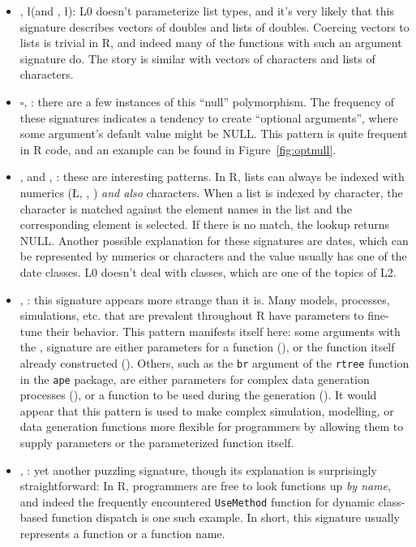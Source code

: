 \documentclass[acmsmall,10pt,review,anonymous]{acmart}\settopmatter{printfolios=true,printccs=false,printacmref=false}
\begin{document}
\begin{itemize}

	\item \D, \l (and \C, \l): L0 doesn't parameterize list types, and it's very likely that this signature describes vectors of doubles and lists of doubles.
	Coercing vectors to lists is trivial in R, and indeed many of the functions with such an argument signature do.
	The story is similar with vectors of characters and lists of characters.
	
	\item $\square$, \sN: there are a few instances of this ``null'' polymorphism.
	The frequency of these signatures indicates a tendency to create ``optional arguments'', where some argument's default value might be NULL.
	This pattern is quite frequent in R code, and an example can be found in Figure~\ref{fig:optnull}.

	\item \C, \D and \C, \I: these are interesting patterns.
	In R, lists can always be indexed with numerics (\L, \D, \I) {\it and also} characters.
	When a list is indexed by character, the character is matched against the element names in the list and the corresponding element is selected.
	If there is no match, the lookup returns NULL.
	Another possible explanation for these signatures are dates, which can be represented by numerics or characters and the value usually has one of the date classes.
	L0 doesn't deal with classes, which are one of the topics of L2.

	\item \D, \sF: this signature appears more strange than it is.
	Many models, processes, simulations, etc. that are prevalent throughout R have parameters to fine-tune their behavior.
	This pattern manifests itself here: some arguments with the \D, \sF signature are either parameters for a function (\D), or the function itself already constructed (\sF).
	Others, such as the {\tt br} argument of the {\tt rtree} function in the {\tt ape} package, are either parameters for complex data generation processes (\D), or a function to be used during the generation (\sF).
	It would appear that this pattern is used to make complex simulation, modelling, or data generation functions more flexible for programmers by allowing them to supply parameters or the parameterized function itself.
	
	\item \C, \sF: yet another puzzling signature, though its explanation is surprisingly straightforward:
	In R, programmers are free to look functions up {\it by name}, and indeed the frequently encountered {\tt UseMethod} function for dynamic class-based function dispatch is one such example.
	In short, this signature usually represents a function or a function name.

\end{itemize}
\end{document}
